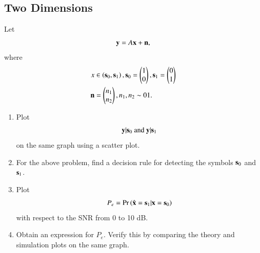 \documentclass[journal,12pt,twocolumn]{IEEEtran}
\renewcommand\thesection{\arabic{section}}
\begin{document}
\begin{enumerate}[label=\thesection.\arabic*
,ref=\thesection.\theenumi]
\section{Two Dimensions}
Let
\begin{equation}
\mathbf{y} = A\mathbf{x} + \mathbf{n},
\end{equation}
where
\begin{align}
x &\in \left(\mathbf{s}_0,\mathbf{s}_1\right),
\mathbf{s}_0 =
\begin{pmatrix}
1
\\
0
\end{pmatrix},
\mathbf{s}_1 =
\begin{pmatrix}
0
\\
1
\end{pmatrix}
\\
\mathbf{n} &=
\begin{pmatrix}
n_1
\\
n_2
\end{pmatrix},
n_1,n_2 \sim {0}{1}.
\end{align}
%
\begin{enumerate}[label=\thesection.\arabic*
,ref=\thesection.\theenumi]
\item
\label{ch5_fsk}
Plot
%
\begin{equation}
\mathbf{y}|\mathbf{s}_0 \text{ and } \mathbf{y}|\mathbf{s}_1
\end{equation}
%
on the same graph using a scatter plot.
%
\item
For the above problem, find a decision rule for detecting the symbols $\mathbf{s}_0 $ and $\mathbf{s}_1$.
%
\item
Plot
\begin{equation}
P_e = \Pr\left(\hat{\mathbf{x}} = \mathbf{s}_1|\mathbf{x} = \mathbf{s}_0\right)
\end{equation}
with respect to the SNR from 0 to 10 dB.
%
\item
Obtain an expression for $P_e$. Verify this by comparing the theory and simulation plots on the same graph.
%
		\end{enumerate}

\end{enumerate}
\end{document}
